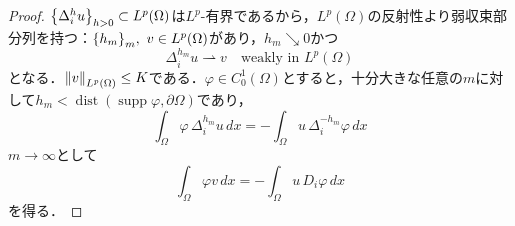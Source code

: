 \documentclass[a4paper]{ltjsarticle}
\newcommand{\Om}{\Omega}
\newcommand{\pOm}{\partial\Omega}
\newcommand{\1}{\mathbbm{1}}
\DeclareMathOperator{\dist}{\mathrm{dist}}
\DeclareMathOperator{\supp}{\mathrm{supp}}
\numberwithin{equation}{section}
\theoremstyle{definition}
\begin{document}
\begin{proof}
    $\qty{\Delta^h_iu}_{h>0}\subset L^p(\Om)$は$L^p$-有界であるから，$L^p(\Om)$の反射性より弱収束部分列を持つ：$\qty{h_m}_{m},\ v\in L^p(\Om)$があり，$h_m\searrow 0$かつ
    \begin{equation}
        \Delta^{h_m}_{i}u\rightharpoonup v\quad \text{weakly in $L^p(\Om)$}
    \end{equation}
    となる．$\norm{v}_{L^p(\Om)}\leq K$である．$\varphi\in C^1_0(\Om)$とすると，十分大きな任意の$m$に対して$h_m<\dist(\supp\varphi,\pOm)$であり，
    \begin{equation}
        \int_{\Om}\varphi\,\Delta^{h_m}_{i}u\,dx=-\int_{\Om}u\,\Delta^{-h_m}_{i}\varphi\,dx
    \end{equation}
    $m\to\infty$として
    \begin{equation}
        \int_{\Om}\varphi v\,dx=-\int_{\Om}u\,D_i\varphi\,dx 
    \end{equation}
    を得る．
\end{proof}
\end{document}
